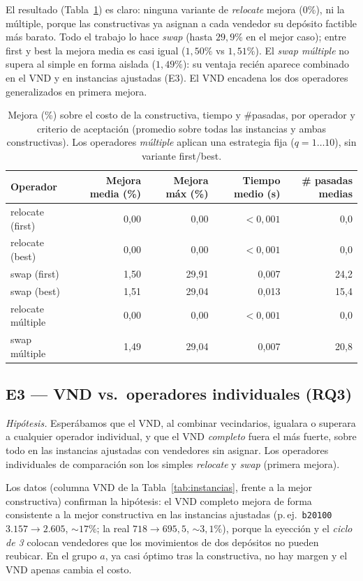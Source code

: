 \documentclass[11pt,a4paper]{article}
\newcommand{\code}[1]{\texttt{#1}}
\begin{document}
El resultado (Tabla~\ref{tab:bl}) es claro: ninguna variante de \emph{relocate} mejora (0\%), ni
la múltiple, porque las constructivas ya asignan a cada vendedor su depósito factible más barato.
Todo el trabajo lo hace \emph{swap} (hasta $29{,}9\%$ en el mejor caso); entre first y best la
mejora media es casi igual ($1{,}50\%$ vs $1{,}51\%$). El \emph{swap múltiple} no supera al simple
en forma aislada ($1{,}49\%$): su ventaja recién aparece combinado en el VND y en instancias
ajustadas (E3). El VND encadena los dos operadores generalizados en primera mejora.

\begin{table}[ht]
\centering
\caption{Mejora (\%) sobre el costo de la constructiva, tiempo y \#pasadas, por operador y
criterio de aceptación (promedio sobre todas las instancias y ambas constructivas). Los
operadores \emph{múltiple} aplican una estrategia fija ($q{=}1\dots10$), sin variante first/best.}
\label{tab:bl}
\small
\begin{tabular}{l r r r r}
\toprule
Operador & Mejora media (\%) & Mejora máx (\%) & Tiempo medio (s) & \# pasadas medias \\
\midrule
relocate (first)   & 0,00 & 0,00  & $<0{,}001$ & 0,0 \\
relocate (best)    & 0,00 & 0,00  & $<0{,}001$ & 0,0 \\
swap (first)       & 1,50 & 29,91 & 0,007 & 24,2 \\
swap (best)        & 1,51 & 29,04 & 0,013 & 15,4 \\
\midrule
relocate múltiple  & 0,00 & 0,00  & $<0{,}001$ & 0,0 \\
swap múltiple      & 1,49 & 29,04 & 0,007 & 20,8 \\
\bottomrule
\end{tabular}
\end{table}

\subsection{E3 --- VND vs.\ operadores individuales (RQ3)}
\emph{Hipótesis.} Esperábamos que el VND, al combinar vecindarios, igualara o superara a
cualquier operador individual, y que el VND \emph{completo} fuera el más fuerte, sobre todo en
las instancias ajustadas con vendedores sin asignar. Los operadores individuales de comparación
son los simples \emph{relocate} y \emph{swap} (primera mejora).

Los datos (columna VND de la Tabla~\ref{tab:instancias}, frente a la mejor constructiva)
confirman la hipótesis: el VND completo mejora de forma consistente a la mejor constructiva en
las instancias ajustadas (p.\,ej.\ \code{b20100} $3.157\to2.605$, $\sim17\%$; la real
$718\to695{,}5$, $\sim3{,}1\%$), porque la eyección y el \emph{ciclo de 3} colocan vendedores
que los movimientos de dos depósitos no pueden reubicar. En el grupo $a$, ya casi óptimo tras
la constructiva, no hay margen y el VND apenas cambia el costo.
\end{document}
